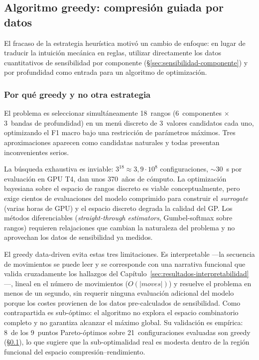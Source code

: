 \subsection{Algoritmo greedy: compresión guiada por datos}
\label{sec:greedy-algorithm}

El fracaso de la estrategia heurística motivó un cambio de enfoque: en
lugar de traducir la intuición mecánica en reglas, utilizar directamente
los datos cuantitativos de sensibilidad por componente
(\S\ref{sec:sensibilidad-componente}) y por profundidad como entrada para
un algoritmo de optimización.

\subsubsection{Por qué greedy y no otra estrategia}

El problema es seleccionar simultáneamente 18~rangos (6~componentes
$\times$ 3~bandas de profundidad) en un menú discreto de 3~valores
candidatos cada uno, optimizando el F1 macro bajo una restricción de
parámetros máximos. Tres aproximaciones aparecen como candidatas
naturales y todas presentan inconvenientes serios.

La búsqueda exhaustiva es inviable: $3^{18} \approx 3{,}9\cdot 10^8$
configuraciones, $\sim$30~s por evaluación en GPU T4, dan unos
370~años de cómputo. La optimización bayesiana sobre el espacio de
rangos discreto es viable conceptualmente, pero exige cientos de
evaluaciones del modelo comprimido para construir el \emph{surrogate}
(varias horas de GPU) y el espacio discreto degrada la calidad del GP.
Los métodos diferenciables (\textit{straight-through estimators},
Gumbel-softmax sobre rangos) requieren relajaciones que cambian la
naturaleza del problema y no aprovechan los datos de sensibilidad ya
medidos.

El greedy data-driven evita estas tres limitaciones. Es interpretable
---la secuencia de movimientos se puede leer y se corresponde con una
narrativa funcional que valida cruzadamente los hallazgos del
Capítulo~\ref{sec:resultados-interpretabilidad}---, lineal en el
número de movimientos ($O(|moves|)$) y resuelve el problema en menos
de un segundo, sin requerir ninguna evaluación adicional del modelo
porque los costes provienen de los datos pre-calculados de
sensibilidad. Como contrapartida es sub-óptimo: el algoritmo no
explora el espacio combinatorio completo y no garantiza alcanzar el
máximo global. Su validación es empírica: 8~de los 9~puntos
Pareto-óptimos sobre 21~configuraciones evaluadas son greedy
(\S\ref{sec:greedy-algorithm}), lo que sugiere que la sub-optimalidad
real es modesta dentro de la región funcional del espacio
compresión--rendimiento.

